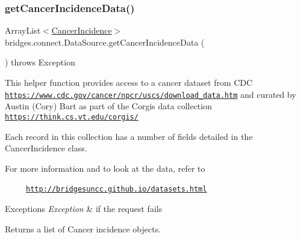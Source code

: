 \mbox{\label{classbridges_1_1connect_1_1_data_source_a320ce56eeb655c54c0fbed455e0d9f5e}} 
\subsubsection{\texorpdfstring{get\+Cancer\+Incidence\+Data()}{getCancerIncidenceData()}}
{\footnotesize\ttfamily Array\+List$<$\hyperlink{classbridges_1_1data__src__dependent_1_1_cancer_incidence}{Cancer\+Incidence}$>$ bridges.\+connect.\+Data\+Source.\+get\+Cancer\+Incidence\+Data (\begin{DoxyParamCaption}{ }\end{DoxyParamCaption}) throws Exception}

This helper function provides access to a cancer dataset from C\+DC \href{https://www.cdc.gov/cancer/npcr/uscs/download_data.htm}{\tt https\+://www.\+cdc.\+gov/cancer/npcr/uscs/download\+\_\+data.\+htm} and curated by Austin (Cory) Bart as part of the Corgis data collection \href{https://think.cs.vt.edu/corgis/}{\tt https\+://think.\+cs.\+vt.\+edu/corgis/}

Each record in this collection has a number of fields detailed in the Cancer\+Incidence class.

For more information and to look at the data, refer to 

~~~~~\href{http://bridgesuncc.github.io/datasets.html}{\tt http\+://bridgesuncc.\+github.\+io/datasets.\+html} 


\begin{DoxyExceptions}{Exceptions}
{\em Exception} & if the request fails\\
\hline
\end{DoxyExceptions}
\begin{DoxyReturn}{Returns}
a list of Cancer incidence objects. 
\end{DoxyReturn}
\mbox{\label{classbridges_1_1connect_1_1_data_source_a9556950d89b39ce61bead0879d1e2192}} 
